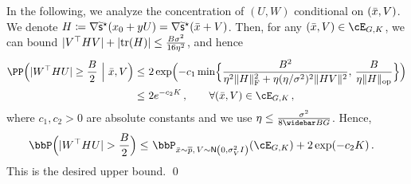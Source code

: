In the following, we analyze the concentration of $(U,W)$ conditional on $(\bar{x},V)$.
We denote $H\coloneqq \nabla\widetilde{\mathsf{s}}^\star(x_0+yU)=\nabla\widetilde{\mathsf{s}}^\star(\bar{x}+V)$. 
Then, for any $(\xbar,V)\in\cE_{G,K}$, we can bound $\lvert V^\top HV\rvert+\lvert\mathrm{tr}(H)\rvert\leq \frac{B\sigma^2}{16\eta^2}$, and hence
\begin{align*}
    \PP\prn[\Big]{\Bigl. \abs{W\tp H U}\geq \frac{B}{2} ~\Bigr|~ \xbar, V} 
    \leq&~ 2\exp\prn[\Big]{-c_1\min\crl[\Big]{\frac{B^2}{\eta^2\nrmF{H}^2+\eta (\eta/\sigma^2)^2\nrm{HV}^2},\, \frac{B}{\eta\nrmop{H}}}} \\
    \leq&~ 2e^{-c_2K}\,, \qquad \forall (\xbar,V)\in\cE_{G,K}\,,
\end{align*}
where $c_1,c_2>0$ are absolute constants and we use $\eta\leq \frac{\sigma^2}{8\Bbar G}$. 
Hence,
\begin{align*}
    \bbP\prn[\Big]{\abs{W\tp H U}>\frac{\B}{2}}
    \leq&~ \bbP_{\xbar\sim \pbar,\, V\sim\normal{0,\sigma_V^2\Id}}(\cE_{G,K})+2\exp\prn*{-c_2K}\,.
\end{align*}
This is the desired upper bound.
\qed


